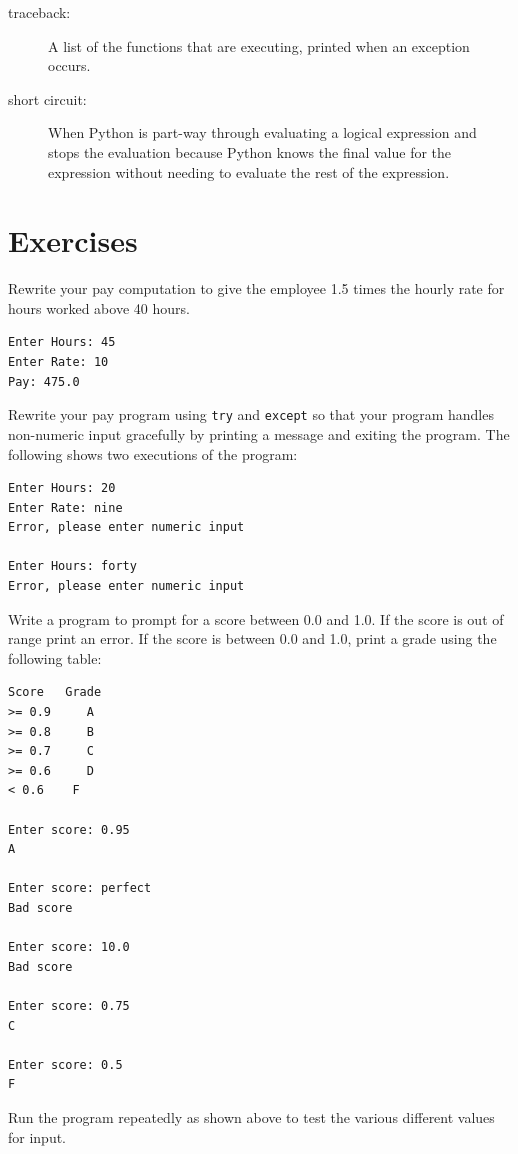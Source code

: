 \documentclass[10pt]{book}
\begin{document}
\begin{description}
\item[traceback:]  A list of the functions that are executing,
printed when an exception occurs.

\item[short circuit:]  When Python is part-way through evaluating a 
logical expression and stops the evaluation because Python 
knows the final value for the expression 
without needing to evaluate the rest of the expression.

\end{description}

\section{Exercises}

\begin{ex}
Rewrite your pay computation to give the employee 1.5 
times the hourly rate for 
hours worked above 40 hours.

\begin{verbatim}
Enter Hours: 45
Enter Rate: 10
Pay: 475.0
\end{verbatim}
\end{ex}

\begin{ex}
Rewrite your pay program using {\tt try} and {\tt except} 
so that your program handles non-numeric input gracefully
by printing a message and exiting the program.
The following shows two executions of the program:

\begin{verbatim}
Enter Hours: 20
Enter Rate: nine
Error, please enter numeric input

Enter Hours: forty
Error, please enter numeric input
\end{verbatim}
\end{ex}

\begin{ex}
Write a program to prompt for a score between 0.0 and 1.0.
If the score is out of range print an error.  If the score
is between 0.0 and 1.0, print a grade using the following 
table:

\begin{verbatim}
Score   Grade
>= 0.9     A
>= 0.8     B
>= 0.7     C
>= 0.6     D
< 0.6    F

Enter score: 0.95
A

Enter score: perfect
Bad score

Enter score: 10.0
Bad score

Enter score: 0.75
C

Enter score: 0.5
F
\end{verbatim}

Run the program repeatedly as shown above to test the 
various different values for input.
\end{ex}
\end{document}
